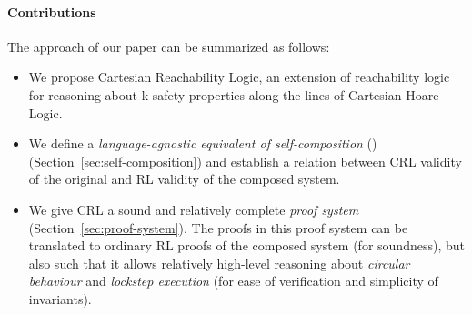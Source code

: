 \paragraph{Contributions} The approach of our paper can be summarized as follows:
\begin{itemize}
\item We propose Cartesian Reachability Logic, an extension of reachability
  logic for reasoning about k-safety properties along the lines of Cartesian
  Hoare Logic.
\item We define a \emph{language-agnostic equivalent of self-composition}
  (\cite{BartheDR11}) (Section~\ref{sec:self-composition}) and establish a relation between CRL validity of the
  original and RL validity of the composed system.
\item We give CRL a sound and relatively complete \emph{proof system}
  (Section~\ref{sec:proof-system}). The proofs in this proof system can be
  translated to ordinary RL proofs of the composed system (for soundness), but
  also such that it allows relatively high-level reasoning about
  \emph{circular behaviour} and \emph{lockstep execution} (for ease of
  verification and simplicity of invariants).
\end{itemize}



